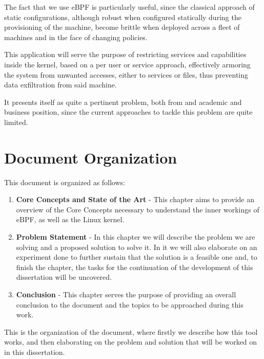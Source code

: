 The fact that we use eBPF is particularly useful, since the classical approach of static configurations, although robust when configured statically during the provisioning of the machine, become brittle when deployed across a fleet of machines and in the face of changing policies. 

This application will serve the purpose of restricting services and capabilities inside the kernel, based on a per user or service approach, effectively armoring the system from unwanted accesses, either to services or files, thus preventing data exfiltration from said machine. 

It presents itself as quite a pertinent problem, both from and academic and business position, since the current approaches to tackle this problem are quite limited.

\section{Document Organization}

This document is organized as follows:
\begin{enumerate}
    \item \textbf{Core Concepts and State of the Art} - This chapter aims to provide an overview of the Core Concepts necessary to understand the inner workings of eBPF, as well as the Linux kernel.
    \item \textbf{Problem Statement} - In this chapter we will describe the problem we are solving and a proposed solution to solve it. In it we will also elaborate on an experiment done to further sustain that the solution is a feasible one and, to finish the chapter, the tasks for the continuation of the development of this dissertation will be uncovered.
    \item \textbf{Conclusion} - This chapter serves the purpose of providing an overall conclusion to the document and the topics to be approached during this work.
\end{enumerate}

This is the organization of the document, where firstly we describe how this tool works, and then elaborating on the problem and solution that will be worked on in this dissertation.
